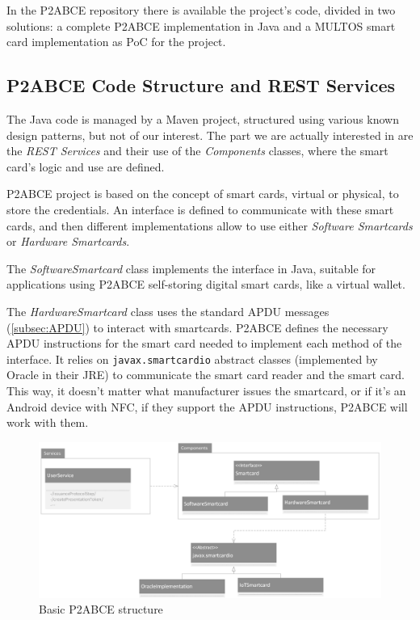 \hfil

In the P2ABCE repository \citep{p2abcurl} there is available the project's code, divided in two solutions: a complete P2ABCE implementation in Java and a MULTOS smart card implementation as PoC for the project.

\subsection{P2ABCE Code Structure and REST Services}

The Java code is managed by a Maven project, structured using various known design patterns, but not of our interest. The part we are actually interested in are the \textit{REST Services} and their use of the \textit{Components} classes, where the smart card's logic and use are defined.

P2ABCE project is based on the concept of smart cards, virtual or physical, to store the credentials. An interface is defined to communicate with these smart cards, and then different implementations allow to use either \textit{Software Smartcards} or \textit{Hardware Smartcards}. 

The \textit{SoftwareSmartcard} class implements the interface in Java, suitable for applications using P2ABCE self-storing digital smart cards, like a virtual wallet.

The \textit{HardwareSmartcard} class uses the standard APDU messages (\ref{subsec:APDU}) to interact with smartcards. P2ABCE defines the necessary APDU instructions for the smart card needed to implement each method of the interface. It relies on \texttt{javax.smartcardio} abstract classes (implemented by Oracle in their JRE) to communicate the smart card reader and the smart card. This way, it doesn't matter what manufacturer issues the smartcard, or if it's an Android device with NFC, if they support the APDU instructions, P2ABCE will work with them.

\begin{figure}[bth]
	\begin{center}
		\includegraphics[width=\linewidth]{gfx/UML/p2abceBasicUML}
	\end{center}
	\caption{Basic P2ABCE structure}
	\label{fig:p2abceBasicUML}
\end{figure}


